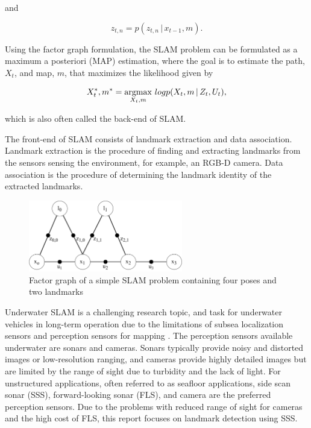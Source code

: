 and

\begin{equation}
    z_{t,n} = p(z_{t,n} \,|\, x_{t-1},m).
    \label{eq:landmark_measurement_pdf}
\end{equation}

Using the factor graph formulation, the SLAM problem can be formulated as a maximum a posteriori (MAP) estimation, where the goal is to estimate the path, $X_t$, and map, $m$, that maximizes the likelihood given by

\begin{equation}
    X_t^*, m^* = \operatorname*{argmax}_{X_t,m} \, logp(X_t,m \,|\, Z_t,U_t),
    \label{eq:SLAM}
\end{equation}

which is also often called the back-end of SLAM.

The front-end of SLAM consists of landmark extraction and data association. Landmark extraction is the procedure of finding and extracting landmarks from the sensors sensing the environment, for example, an RGB-D camera.  Data association is the procedure of determining the landmark identity of the extracted landmarks.

\begin{figure} [h]
    \centering
    \includegraphics[width=0.6\textwidth]{figures/factor_graph.drawio.pdf}
    \caption{Factor graph of a simple SLAM problem containing four poses and two landmarks}
    \label{fig:factor_graph}
\end{figure}


Underwater SLAM is a challenging research topic, and task for underwater vehicles in long-term operation due to the limitations of subsea localization sensors and perception sensors for mapping \cite{Hidalgo2015ReviewTechniques}. The perception sensors available underwater are sonars and cameras. Sonars typically provide noisy and distorted images or low-resolution ranging, and cameras provide highly detailed images but are limited by the range of sight due to turbidity and the lack of light. For unstructured applications, often referred to as seafloor applications, side scan sonar (SSS), forward-looking sonar (FLS), and camera are the preferred perception sensors. Due to the problems with reduced range of sight for cameras and the high cost of FLS, this report focuses on landmark detection using SSS.

